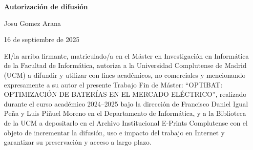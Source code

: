 \newpage

\thispagestyle{empty}

\begin{center}

  {\bf \Huge Autorización de difusión}

  \vspace{1cm}

  \large Josu Gomez Arana

  \vspace{0.5cm}

  16 de septiembre de 2025

  \vspace{0.5cm}

\end{center}

El/la arriba firmante, matriculado/a en el Máster en Investigación en Informática de la Facultad de Informática, autoriza a la Universidad Complutense de Madrid (UCM) a difundir y utilizar con fines académicos, no comerciales y mencionando expresamente a su autor el presente Trabajo Fin de Máster: “OPTIBAT\@: OPTIMIZACIÓN DE BATERÍAS EN EL MERCADO ELÉCTRICO”, realizado durante el curso académico 2024--2025 bajo la dirección de Francisco Daniel Igual Peña y Luis Piñuel Moreno en el Departamento de Informática, y a la Biblioteca de la UCM a depositarlo en el Archivo Institucional E-Prints Complutense con el objeto de incrementar la difusión, uso e impacto del trabajo en Internet y garantizar su preservación y acceso a largo plazo.
